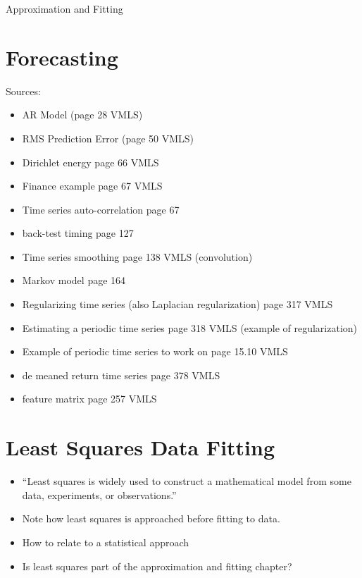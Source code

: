 \begin{chapter}{Approximation and Fitting}
\section{Forecasting}
    Sources:
    \begin{itemize}
        \item AR Model (page 28 VMLS)
        \item RMS Prediction Error (page 50 VMLS)
        \item Dirichlet energy page 66 VMLS
        \item Finance example page 67 VMLS
        \item Time series auto-correlation page 67
        \item back-test timing page 127
        \item Time series smoothing page 138 VMLS (convolution)
        \item Markov model page 164
        \item Regularizing time series (also Laplacian regularization) page 317 VMLS
        \item Estimating a periodic time series page 318 VMLS (example of regularization)
        \item Example of periodic time series to work on page 15.10 VMLS
        \item de meaned return time series page 378 VMLS
        \item feature matrix page 257 VMLS
    \end{itemize}

    \section{Least Squares Data Fitting}
    \begin{itemize}
        \item ``Least squares is widely used to construct a mathematical model from some data, experiments, or observations.''
        \item Note how least squares is approached before fitting to data.
        \item How to relate to a statistical approach
        \item Is least squares part of the approximation and fitting chapter?
    \end{itemize}


\end{chapter}
